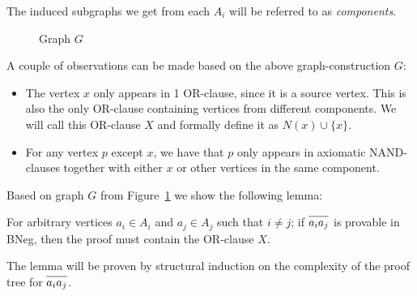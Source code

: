The induced subgraphs we get from each $A_i$ will be referred to as \textit{components}.\par
\begin{figure}[!h]
  \centering
  \caption{Graph $G$}
  \label{fig:components_link}
\end{figure}
A couple of observations can be made based on the above graph-construction $G$:
\begin{itemize}
  \item The vertex $x$ only appears in 1 OR-clause, since it is a source vertex.
  This is also the only OR-clause containing vertices from different components.
  We will call this OR-clause $X$ and formally define it as $N(x) \cup \{ x\}$.
  \item For any vertex $p$ except $x$, we have that $p$ only appears in axiomatic NAND-clauses together with either $x$ or other vertices in the same component.
\end{itemize}
Based on graph $G$ from Figure~\ref{fig:components_link} we show the following lemma:
\begin{lemma}
  For arbitrary vertices $a_i \in A_i$ and $a_j \in A_j$ such that $i \neq j$; if $\ol{a_ia_j}$ is provable in BNeg, then the proof must contain the OR-clause $X$.
  \label{thm:or_clause_lemma}
\end{lemma}
The lemma will be proven by structural induction on the complexity of the proof tree for $\ol{a_ia_j}$.
